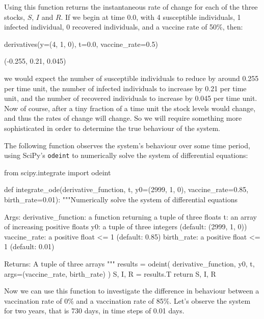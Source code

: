 Using this function returns the instantaneous rate of change for each of the
three stocks, $S$, $I$ and $R$. If we begin at time 0.0, with 4 susceptible
individuals, 1 infected individual, 0 recovered individuals, and a vaccine rate
of 50\%, then:

\begin{pyin}
derivatives(y=(4, 1, 0), t=0.0, vaccine_rate=0.5)
\end{pyin}

\begin{pyout}
(-0.255, 0.21, 0.045)
\end{pyout}

we would expect the number of susceptible individuals to reduce by around 0.255
per time unit, the number of infected individuals to increase by 0.21 per time
unit, and the number of recovered individuals to increase by 0.045 per time
unit. Now of course, after a tiny fraction of a time unit the stock levels would
change, and thus the rates of change will change. So we will require something
more sophisticated in order to determine the true behaviour of the system.

The following function observes the system's behaviour over some time period,
using SciPy's \texttt{odeint} to numerically solve the system of
differential equations:

\begin{pyin}
from scipy.integrate import odeint

def integrate_ode(derivative_function, t,
                  y0=(2999, 1, 0),
                  vaccine_rate=0.85,
                  birth_rate=0.01):
    """Numerically solve the system of differential equations
    
    Args:
        derivative_function: a function returning a tuple
                             of three floats
        t: an array of increasing positive floats
        y0: a tuple of three integers (default: (2999, 1, 0))
        vaccine_rate: a positive float <= 1 (default: 0.85)
        birth_rate: a positive float <= 1 (default: 0.01)
    
    Returns:
        A tuple of three arrays
    """
    results = odeint(
        derivative_function,
        y0, t,
        args=(vaccine_rate, birth_rate)
    )
    S, I, R = results.T
    return S, I, R
\end{pyin}

Now we can use this function to investigate the difference in behaviour between
a vaccination rate of 0\% and a vaccination rate of 85\%. Let's observe the
system for two years, that is 730 days, in time steps of 0.01 days.

